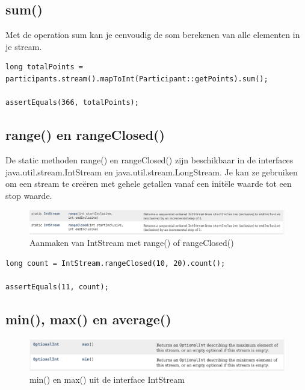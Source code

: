 \subsection{sum()}

Met de operation sum kan je eenvoudig de som berekenen van alle elementen in je stream.

\begin{lstlisting}
long totalPoints = participants.stream().mapToInt(Participant::getPoints).sum();

assertEquals(366, totalPoints);
\end{lstlisting}
		

\subsection{range() en rangeClosed()}
		
De static methoden range() en rangeClosed() zijn beschikbaar in de interfaces java.util.stream.IntStream en java.util.stream.LongStream. Je kan ze gebruiken om een stream te cre\"eren met gehele getallen vanaf een init\"ele waarde tot een stop waarde.
\begin{figure}[H]
  \includegraphics[width=\linewidth]{images/h6/intstream_range.png}
  \caption{Aanmaken van IntStream met range() of rangeClosed()}
  \label{fig:stream_foreach}
\end{figure}

\begin{lstlisting}
long count = IntStream.rangeClosed(10, 20).count();

assertEquals(11, count);
\end{lstlisting}

\subsection{min(), max() en average()}

\begin{figure}[H]
\includegraphics[width=\linewidth]{images/h6/intstream_max_min.png}
\caption{min() en max() uit de interface IntStream}
\label{fig:instream_min_max}
\end{figure}

